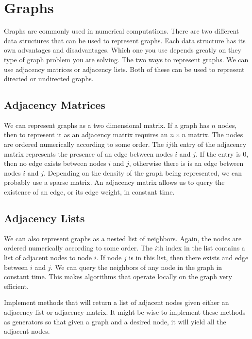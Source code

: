 \section*{Graphs}
Graphs are commonly used in numerical computations.
There are two different data structures that can be used to represent graphs.
Each data structure has its own advantages and disadvantages.
Which one you use depends greatly on they type of graph problem you are solving.
The two ways to represent graphs.  We can use adjacency matrices or adjacency lists.
Both of these can be used to represent directed or undirected graphs.

\subsection*{Adjacency Matrices}
We can represent graphs as a two dimensional matrix.  If a graph has $n$ nodes, then
to represent it as an adjacency matrix requires an $n \times n$ matrix.
The nodes are ordered numerically according to some order.
The $ij$th entry of the adjacency matrix represents the presence of an edge between nodes $i$ and $j$.
If the entry is 0, then no edge exists between nodes $i$ and $j$, otherwise there is is an edge between nodes $i$ and $j$.
Depending on the density of the graph being represented, we can probably use a sparse matrix.
An adjacency matrix allows us to query the existence of an edge, or its edge weight, in constant time.

\subsection*{Adjacency Lists}
We can also represent graphs as a nested list of neighbors.
Again, the nodes are ordered numerically according to some order.
The $i$th index in the list contains a list of adjacent nodes to node $i$.  
If node $j$ is in this list, then there exists and edge between $i$ and $j$.
We can query the neighbors of any node in the graph in constant time.
This makes algorithms that operate locally on the graph very efficient. 

\begin{problem}
Implement methods that will return a list of adjacent nodes given either an adjacency list or adjacency matrix.
It might be wise to implement these methods as generators so that given a graph and a desired node, it will yield all the adjacent nodes.
\end{problem}


